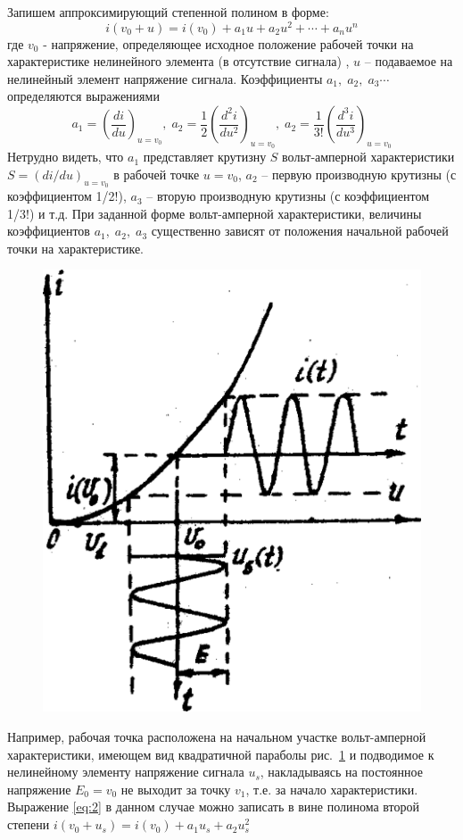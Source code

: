 Запишем аппроксимирующий степенной полином в форме:
\begin{equation}
i(v_0+u)=i(v_0)+a_1u+a_2u^2+\cdots+a_nu^n
\label{eq:2}
\end{equation}
где $v_0$ - напряжение, определяющее исходное положение рабочей точки на характеристике нелинейного элемента (в отсутствие сигнала) , $u$ -- подаваемое на нелинейный элемент напряжение сигнала. Коэффициенты $a_1,\;a_2,\;a_3\cdots$ определяются выражениями
\begin{equation}
a_1=\left(\frac{di}{du}\right)_{u=v_0},\;a_2=\frac{1}{2}\left(\frac{d^2i}{du^2}\right)_{u=v_0},\;a_2=\frac{1}{3!}\left(\frac{d^3i}{du^3}\right)_{u=v_0}
\label{eq:3}
\end{equation}
Нетрудно видеть, что $a_1$ представляет крутизну $S$ вольт-амперной характеристики $S=(di/du)_{u=v_0}$ в рабочей точке $u=v_0$,
$a_2$ -- первую производную крутизны (с коэффициентом 1/2!),
$a_3$ -- вторую производную крутизны (с коэффициентом 1/3!) и т.д. При заданной форме вольт-амперной характеристики, величины коэффициентов $a_1,\;a_2,\;a_3$ существенно зависят от положения начальной рабочей точки на характеристике.
\begin{figure}
	\centering
	\includegraphics[width=0.6\linewidth]{picture/pic1}
	\caption{}
	\label{pic:1}
\end{figure}

Например, рабочая точка расположена на начальном участке вольт-амперной характеристики, имеющем вид квадратичной параболы рис.~\ref{pic:1} и подводимое к нелинейному элементу напряжение сигнала $u_s$, накладываясь на постоянное напряжение $E_0=v_0$ не выходит за точку $v_1$, т.е. за начало характеристики.
Выражение \eqref{eq:2} в данном случае можно записать в вине полинома второй степени $i(v_0+u_s)=i(v_0)+a_1u_s+a_2u_s^2$ 

